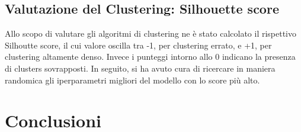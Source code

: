 \documentclass[12pt,oneside]{article}
\begin{document}
    \begin{enumerate}
    \subsection{Valutazione del Clustering: Silhouette score}
    \begin{justify}
        Allo scopo di valutare gli algoritmi di clustering ne è stato calcolato il rispettivo Silhoutte score, il cui valore oscilla tra -1, per clustering errato, e +1, per clustering altamente denso. Invece i punteggi intorno allo 0 indicano la presenza di clusters sovrapposti. 
        In seguito, si ha avuto cura di ricercare in maniera randomica gli iperparametri migliori del modello con lo score più alto.
    \end{justify}
    \end{enumerate}

\section{Conclusioni}

    
\end{document}
